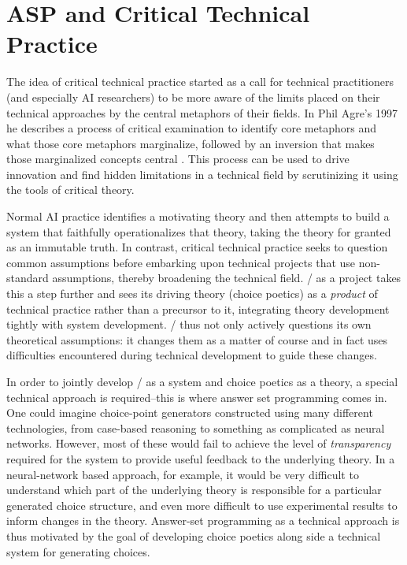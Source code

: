 
\section{ASP and Critical Technical Practice}
\label{sec:dunyazad-asp-and-ctp}

The idea of critical technical practice started as a call for technical practitioners (and especially AI researchers) to be more aware of the limits placed on their technical approaches by the central metaphors of their fields.
%
In Phil Agre's 1997  he describes a process of critical examination to identify core metaphors and what those core metaphors marginalize, followed by an inversion that makes those marginalized concepts central \citep{Agre1997}.
%
This process can be used to drive innovation and find hidden limitations in a technical field by scrutinizing it using the tools of critical theory.


Normal AI practice identifies a motivating theory and then attempts to build a system that faithfully operationalizes that theory, taking the theory for granted as an immutable truth.
%
In contrast, critical technical practice seeks to question common assumptions before embarking upon technical projects that use non-standard assumptions, thereby broadening the technical field.
%
\dunyazad/ as a project takes this a step further and sees its driving theory (choice poetics) as a \emph{product} of technical practice rather than a precursor to it, integrating theory development tightly with system development.
%
\dunyazad/ thus not only actively questions its own theoretical assumptions: it changes them as a matter of course and in fact uses difficulties encountered during technical development to guide these changes.


In order to jointly develop \dunyazad/ as a system and choice poetics as a theory, a special technical approach is required--this is where answer set programming comes in.
%
One could imagine choice-point generators constructed using many different technologies, from case-based reasoning to something as complicated as neural networks.
%
However, most of these would fail to achieve the level of \emph{transparency} required for the system to provide useful feedback to the underlying theory.
%
In a neural-network based approach, for example, it would be very difficult to understand which part of the underlying theory is responsible for a particular generated choice structure, and even more difficult to use experimental results to inform changes in the theory.
%
Answer-set programming as a technical approach is thus motivated by the goal of developing choice poetics along side a technical system for generating choices.


